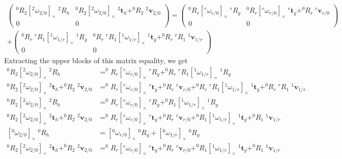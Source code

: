 \documentclass{article}
\newcommand\linvel{\mathbf{v}}
\newcommand\trans{\mathbf{t}}
\begin{document}
\begin{align*}
  \left(\begin{array}{ll}^0R_2[^2\omega_{2/0}]_{\times}\;^2R_h & ^0R_2[^2\omega_{2/0}]_{\times}\;^2\trans_h + ^0R_2\;^2\linvel_{2/0} \\ 0&0\end{array}\right) =
    \left(\begin{array}{ll}^0R_r[^r\omega_{r/0}]_{\times}\;^rR_g & ^0R_r[^r\omega_{r/0}]_{\times}\;^r\trans_g + ^0R_r\;^r\linvel_{r/0} \\ 0&0\end{array}\right) \\
      + \left(\begin{array}{ll}^0R_r\;^rR_1[^1\omega_{1/r}]_{\times}\;^1R_g &
        ^0R_r\;^rR_1[^1\omega_{1/r}]_{\times}\;^1\trans_g  + ^0R_r\;^rR_1\;^1\linvel_{1/r}\\ 0&0\end{array}\right)&
\end{align*}
Extracting the upper blocks of this matrix equality, we get
\begin{align*}
  ^0R_2[^2\omega_{2/0}]_{\times}\;^2R_h &= ^0R_r[^r\omega_{r/0}]_{\times}\;^rR_g + ^0R_r\;^rR_1[^1\omega_{1/r}]_{\times}\;^1R_g \\
  ^0R_2[^2\omega_{2/0}]_{\times}\;^2\trans_h + ^0R_2\;^2\linvel_{2/0} &=
  ^0R_r[^r\omega_{r/0}]_{\times}\;^r\trans_g + ^0R_r\;^r\linvel_{r/0} + ^0R_r\;^rR_1[^1\omega_{1/r}]_{\times}\;^1\trans_g  + ^0R_r\;^rR_1\;^1\linvel_{1/r} \\
  ^0R_2[^2\omega_{2/0}]_{\times}\;^2R_h &= ^0R_r[^r\omega_{r/0}]_{\times}\;^rR_g + ^0R_1[^1\omega_{1/r}]_{\times}\;^1R_g \\
  ^0R_2[^2\omega_{2/0}]_{\times}\;^2\trans_h + ^0R_2\;^2\linvel_{2/0} &=
  ^0R_r[^r\omega_{r/0}]_{\times}\;^r\trans_g + ^0R_r\;^r\linvel_{r/0} + ^0R_1[^1\omega_{1/r}]_{\times}\;^1\trans_g  + ^0R_1\;^1\linvel_{1/r} \\
  [^0\omega_{2/0}]_{\times}\;^0R_h &= [^0\omega_{r/0}]_{\times}\;^0R_g + [^0\omega_{1/r}]_{\times}\;^0R_g \\
  ^0R_2[^2\omega_{2/0}]_{\times}\;^2\trans_h + ^0R_2\;^2\linvel_{2/0} &=
  ^0R_r[^r\omega_{r/0}]_{\times}\;^r\trans_g + ^0R_r\;^r\linvel_{r/0} + ^0R_1[^1\omega_{1/r}]_{\times}\;^1\trans_g  + ^0R_1\;^1\linvel_{1/r} \\
\end{align*}


\end{document}
